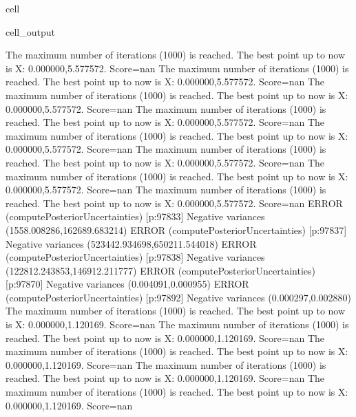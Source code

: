 \documentclass[letterpaper,10pt,english]{jupyterBook}
\begin{document}
\begin{sphinxuseclass}{cell}
\begin{sphinxVerbatimOutput}
\begin{sphinxuseclass}{cell_output}
\begin{sphinxVerbatim}[commandchars=\\\{\}]
The maximum number of iterations (1000) is reached. The best point up to now is X: \PYGZob{}0.000000,\PYGZhy{}5.577572\PYGZcb{}. Score=\PYGZhy{}nan
The maximum number of iterations (1000) is reached. The best point up to now is X: \PYGZob{}0.000000,\PYGZhy{}5.577572\PYGZcb{}. Score=\PYGZhy{}nan
The maximum number of iterations (1000) is reached. The best point up to now is X: \PYGZob{}0.000000,\PYGZhy{}5.577572\PYGZcb{}. Score=\PYGZhy{}nan
The maximum number of iterations (1000) is reached. The best point up to now is X: \PYGZob{}0.000000,\PYGZhy{}5.577572\PYGZcb{}. Score=\PYGZhy{}nan
The maximum number of iterations (1000) is reached. The best point up to now is X: \PYGZob{}0.000000,\PYGZhy{}5.577572\PYGZcb{}. Score=\PYGZhy{}nan
The maximum number of iterations (1000) is reached. The best point up to now is X: \PYGZob{}0.000000,\PYGZhy{}5.577572\PYGZcb{}. Score=\PYGZhy{}nan
The maximum number of iterations (1000) is reached. The best point up to now is X: \PYGZob{}0.000000,\PYGZhy{}5.577572\PYGZcb{}. Score=\PYGZhy{}nan
The maximum number of iterations (1000) is reached. The best point up to now is X: \PYGZob{}0.000000,\PYGZhy{}5.577572\PYGZcb{}. Score=\PYGZhy{}nan
ERROR (compute\PYGZus{}Posterior\PYGZus{}Uncertainties) [p:97833] Negative variances (\PYGZhy{}1558.008286,162689.683214)
ERROR (compute\PYGZus{}Posterior\PYGZus{}Uncertainties) [p:97837] Negative variances (\PYGZhy{}523442.934698,\PYGZhy{}650211.544018)
ERROR (compute\PYGZus{}Posterior\PYGZus{}Uncertainties) [p:97838] Negative variances (\PYGZhy{}122812.243853,\PYGZhy{}146912.211777)
ERROR (compute\PYGZus{}Posterior\PYGZus{}Uncertainties) [p:97870] Negative variances (0.004091,\PYGZhy{}0.000955)
ERROR (compute\PYGZus{}Posterior\PYGZus{}Uncertainties) [p:97892] Negative variances (\PYGZhy{}0.000297,0.002880)
The maximum number of iterations (1000) is reached. The best point up to now is X: \PYGZob{}0.000000,\PYGZhy{}1.120169\PYGZcb{}. Score=\PYGZhy{}nan
The maximum number of iterations (1000) is reached. The best point up to now is X: \PYGZob{}0.000000,\PYGZhy{}1.120169\PYGZcb{}. Score=\PYGZhy{}nan
The maximum number of iterations (1000) is reached. The best point up to now is X: \PYGZob{}0.000000,\PYGZhy{}1.120169\PYGZcb{}. Score=\PYGZhy{}nan
The maximum number of iterations (1000) is reached. The best point up to now is X: \PYGZob{}0.000000,\PYGZhy{}1.120169\PYGZcb{}. Score=\PYGZhy{}nan
The maximum number of iterations (1000) is reached. The best point up to now is X: \PYGZob{}0.000000,\PYGZhy{}1.120169\PYGZcb{}. Score=\PYGZhy{}nan
\end{sphinxVerbatim}


\end{sphinxuseclass}
\end{sphinxVerbatimOutput}
\end{sphinxuseclass}
\end{document}
